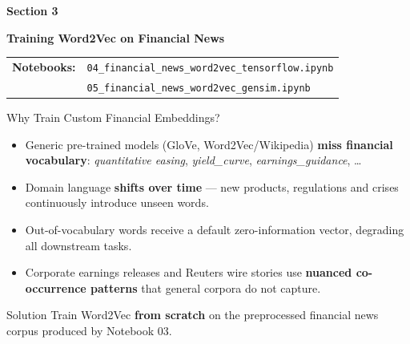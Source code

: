 \documentclass[11pt,aspectratio=169,professionalfonts]{beamer}
\begin{document}
%
\begin{frame}[plain]
\centering
\vspace{1.0cm}
\LARGE{\textbf{Section 3}}
\vspace{0.5cm}

{\Huge \textbf{Training Word2Vec on Financial News}}

\vspace{1.5cm}

{\large
\begin{tabular}{@{}l l@{}}
\textbf{Notebooks:} 
& \texttt{04\_financial\_news\_word2vec\_tensorflow.ipynb} \\[0.3em]
& \texttt{05\_financial\_news\_word2vec\_gensim.ipynb}
\end{tabular}
}

\end{frame}
%
\begin{frame}{Why Train Custom Financial Embeddings?}

  \begin{itemize}
    \setlength\itemsep{0.7em}
    \item Generic pre-trained models (GloVe, Word2Vec/Wikipedia) \textbf{miss
          financial vocabulary}: \textit{quantitative easing},
          \textit{yield\_curve}, \textit{earnings\_guidance}, \ldots
    \item Domain language \textbf{shifts over time} — new products,
          regulations and crises continuously introduce unseen words.
    \item Out-of-vocabulary words receive a \alert{default zero-information
          vector}, degrading all downstream tasks.
    \item Corporate earnings releases and Reuters wire stories use
          \textbf{nuanced co-occurrence patterns} that general corpora
          do not capture.
  \end{itemize}

  \vspace{0.8em}
  \begin{alertblock}{Solution}
    Train Word2Vec \textbf{from scratch} on the preprocessed financial
    news corpus produced by Notebook 03.
  \end{alertblock}

\end{frame}
%
%
\end{document}

